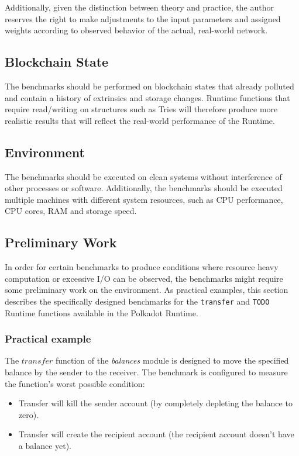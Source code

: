 \documentclass[11pt,a4paper]{article}
\begin{document}
Additionally, given the distinction between theory and practice, the author reserves the right
to make adjustments to the input parameters and assigned weights according to observed behavior
of the actual, real-world network.

\subsection{Blockchain State}
The benchmarks should be performed on blockchain states that already polluted and contain a history of
extrinsics and storage changes. Runtime functions that require read/writing on structures
such as Tries will therefore produce more realistic results that will reflect the real-world
performance of the Runtime.

\subsection{Environment}
The benchmarks should be executed on clean systems without interference of other processes
or software. Additionally, the benchmarks should be executed multiple machines with different
system resources, such as CPU performance, CPU cores, RAM and storage speed.

\subsection{Preliminary Work}
In order for certain benchmarks to produce conditions where resource heavy computation or excessive
I/O can be observed, the benchmarks might require some preliminary work on the environment.
As practical examples, this section describes the specifically designed benchmarks for the \verb|transfer|
and \verb|TODO| Runtime functions available in the Polkadot Runtime.

\subsubsection{Practical example}
The $transfer$ function of the \textit{balances} module is designed to move the specified balance by the sender to the receiver.
The benchmark is configured to measure the function's worst possible condition:

\begin{itemize}
  \item Transfer will kill the sender account (by completely depleting the balance to zero).
  \item Transfer will create the recipient account (the recipient account doesn't have a balance yet).
\end{itemize}
\end{document}
